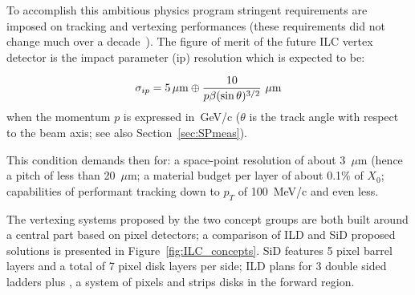 To accomplish this ambitious physics program stringent requirements are imposed on tracking and 
vertexing performances (these requirements did not change much over a 
decade~\cite{ILCVertexing2007,ILCVertexing2016}). 
The  figure of merit of the future ILC vertex detector  is the impact parameter (ip) resolution which is 
expected to be:

\begin{equation}
\sigma_{ip}=5\,\mu{\rm m}\oplus\dfrac{10}{p\beta(\sin\theta)^{3/2}}\,\,\mu{\rm m}
\label{eq:ILCipres}
\end{equation}
when the momentum $p$ is expressed in~GeV/c ($\theta$ is the track angle with respect to the beam 
axis; see also Section~\ref{sec:SPmeas}).

This condition demands then for: a space-point resolution of about 3~$\mu$m (hence a pitch of less 
than 20~$\mu$m; a material budget per layer of about 0.1\% of $X_0$; capabilities of performant    
tracking	down to $p_T$ of 100~MeV/c and even less.

The vertexing systems proposed by the two concept groups are both built around a central 
part based on pixel detectors; a comparison of ILD and SiD proposed solutions is presented in 
Figure~\ref{fig:ILC_concepts}. SiD features 5 pixel barrel layers and a total of 7 pixel disk layers 
per side; ILD plans for 3 double sided ladders plus , a system of pixels and strips disks  in the forward 
region.

